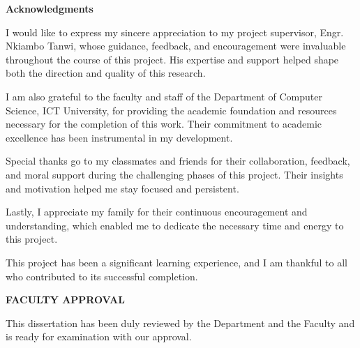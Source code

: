 \vfill %
\clearpage

\thispagestyle{empty}
\begin{center}
\textbf{\large Acknowledgments}
\end{center}

\vspace{2cm} %

I would like to express my sincere appreciation to my project supervisor, Engr. Nkiambo Tanwi, whose guidance, feedback, and encouragement were invaluable throughout the course of this project. His expertise and support helped shape both the direction and quality of this research.

I am also grateful to the faculty and staff of the Department of Computer Science, ICT University, for providing the academic foundation and resources necessary for the completion of this work. Their commitment to academic excellence has been instrumental in my development.

Special thanks go to my classmates and friends for their collaboration, feedback, and moral support during the challenging phases of this project. Their insights and motivation helped me stay focused and persistent.

Lastly, I appreciate my family for their continuous encouragement and understanding, which enabled me to dedicate the necessary time and energy to this project.

This project has been a significant learning experience, and I am thankful to all who contributed to its successful completion.

\vfill %
\clearpage

\thispagestyle{empty}
\begin{center}
\textbf{\large FACULTY APPROVAL}
\end{center}

\vspace{1cm}

This dissertation has been duly reviewed by the Department and the Faculty and is ready for examination with our approval.

\vspace{2cm}

